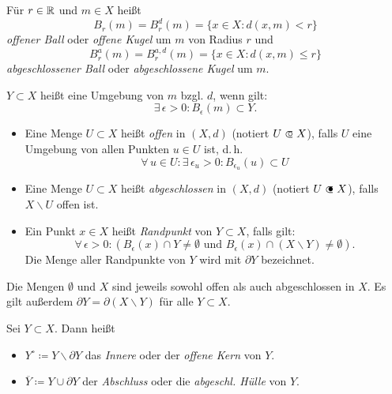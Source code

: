 \documentclass{cheat-sheet}
\begin{document}

\begin{defn}
  Für $r \in \mathbb{R}$ und $m \in X$ heißt
  \[ B_r(m) = B_r^d(m) = \{ x \in X : d(x, m) < r \} \]
  \emph{offener Ball} oder \emph{offene Kugel} um $m$ von Radius $r$ und
  \[ B_r^a(m) = B_r^{a,d}(m) = \{ x \in X : d(x, m) \le r \} \]
  \emph{abgeschlossener Ball} oder \emph{abgeschlossene Kugel} um $m$.
\end{defn}

\begin{defn}
  $Y \subset X$ heißt eine Umgebung von $m$ bzgl. $d$, wenn gilt:
  \[ \exists\,\epsilon > 0 : B_{\epsilon}(m) \subset Y. \]
\end{defn}

\begin{defn}
\begin{itemize}
  \item Eine Menge $U \subset X$ heißt \emph{offen} in $(X, d)$ (notiert $U \opn X$), falls $U$ eine Umgebung von allen Punkten $u \in U$ ist, d.\,h.
  \[ \forall\,u \in U : \exists\,\epsilon_u > 0 : B_{\epsilon_u}(u) \subset U \]
  \item Eine Menge $U \subset X$ heißt \emph{abgeschlossen} in $(X, d)$ (notiert $U \cls X$), falls $X \backslash U$ offen ist.
  \item Ein Punkt $x \in X$ heißt \emph{Randpunkt} von $Y \subset X$, falls gilt:
  \[ \forall\,\epsilon > 0 : ( B_{\epsilon}(x) \cap Y \not= \emptyset \text{ und } B_{\epsilon}(x) \cap (X \backslash Y) \not= \emptyset). \]
  Die Menge aller Randpunkte von $Y$ wird mit \emph{$\partial Y$} bezeichnet.
\end{itemize}
\end{defn}

\begin{bem}
Die Mengen $\emptyset$ und $X$ sind jeweils sowohl offen als auch abgeschlossen in $X$. Es gilt außerdem $\partial Y = \partial (X \backslash Y)$ für alle $Y \subset X$.
\end{bem}

\begin{defn}
Sei $Y \subset X$. Dann heißt
\begin{itemize}
  \item $Y^{\circ} \coloneqq Y \backslash \partial Y$ das \emph{Innere} oder der \emph{offene Kern} von $Y$.
  \item $\overline{Y} \coloneqq Y \cup \partial Y$ der \emph{Abschluss} oder die \emph{abgeschl. Hülle} von $Y$.
\end{itemize}
\end{defn}
\end{document}
